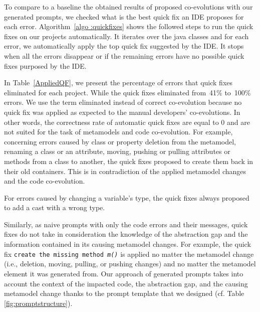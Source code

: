 To compare to a baseline the obtained results of proposed co-evolutions with our generated prompts, we checked what is the best quick fix an IDE proposes for each error. Algorithm~\ref{algo :quickfixes} shows the followed steps to run the quick fixes on our projects automatically. 
It iterates over the java classes and for each error, we  automatically apply the top quick fix suggested by the IDE. 
It stops when all the errors disappear or if the remaining errors have no possible quick fixes purposed by the IDE. 

In Table~\ref{AppliedQF}, we present the percentage of errors that quick fixes eliminated for each project. %
%
While the quick fixes eliminated from~41\% to~100\% errors. We use the term eliminated instead of correct co-evolution because no quick fix was applied as expected to the manual developers' co-evolutions. In other words, the correctness rate of automatic quick fixes are equal to 0 and are not suited for the task of metamodels and code co-evolution.
For example, concerning errors caused by class or property deletion from the metamodel, renaming a class or an attribute, moving, pushing or pulling attributes or methods from a class to another, the quick fixes proposed to create them back in their old containers. This is in contradiction of the applied metamodel changes and the code co-evolution.  

For errors caused by changing a variable's type, the quick fixes always proposed to add a cast with a wrong type. 

Similarly, as naive prompts with only the code errors and their messages, quick fixes do not take in consideration the knowledge of the abstraction gap and the information contained in its causing metamodel changes. For example, the quick fix \texttt{create the missing method \emph{m()}} is applied no matter the metamodel change (i.e., deletion, moving, pulling, or pushing changes) and no matter the metamodel element it was generated from.
Our approach of generated prompts takes into account the context of the impacted code, the abstraction gap, and the causing metamodel change thanks to the prompt template that we designed (cf. Table \ref{fig:promptstructure}).

